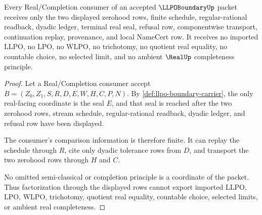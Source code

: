 \begin{theorem}
\label{thm:llpo-boundary-real-comparison-refusal}
Every Real/Completion consumer of an accepted $\LLPOBoundaryUp$ packet receives only the two displayed zerohood rows, finite schedule, regular-rational readback, dyadic ledger, terminal real seal, refusal row, componentwise transport, continuation replay, provenance, and local NameCert row. It receives no imported LLPO, no LPO, no WLPO, no trichotomy, no quotient real equality, no countable choice, no selected limit, and no ambient $\RealUp$ completeness principle.
\end{theorem}
\begin{proof}
Let a Real/Completion consumer accept $B=(Z_0,Z_1,S,R,D,E,W,H,C,P,N)$. By \autoref{def:llpo-boundary-carrier}, the only real-facing coordinate is the seal $E$, and that seal is reached after the two zerohood rows, stream schedule, regular-rational readback, dyadic ledger, and refusal row have been displayed.

The consumer's comparison information is therefore finite. It can replay the schedule through $R$, cite only dyadic tolerance rows from $D$, and transport the two zerohood rows through $H$ and $C$.

No omitted semi-classical or completion principle is a coordinate of the packet. Thus factorization through the displayed rows cannot export imported LLPO, LPO, WLPO, trichotomy, quotient real equality, countable choice, selected limits, or ambient real completeness.
\end{proof}

